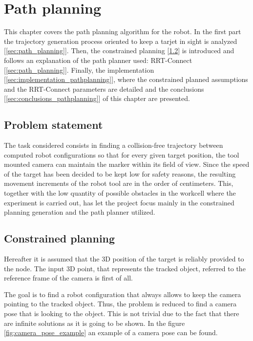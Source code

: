 \chapter{Path planning} %
\label{chap:path_planning}

This chapter covers the path planning algorithm for the robot.
In the first part the trajectory generation process oriented to keep a tarjet in sight is analyzed [\ref{sec:path_planning}]. Then, the constrained planning [\ref{sec:constrained_planning}] is introduced and follows an explanation of the path planner used: RRT-Connect [\ref{sec:path_planning}]. Finally, the implementation [\ref{sec:implementation_pathplanning}], where the constrained planned assumptions and the RRT-Connect parameters are detailed and the conclusions [\ref{sec:conclusions_pathplanning}] of this chapter are presented.
\section{Problem statement} %
\label{sec:path_planning_in_keep_object_in_sight}
The task considered consists in finding a collision-free trajectory between computed robot configurations so that for every given target position, the tool mounted camera can maintain the marker within its field of view. 
Since the speed of the target has been decided to be kept low for safety reasons, the resulting movement increments of the robot tool are in the order of centimeters. 
This, together with the low quantity of possible obstacles in the workcell where the experiment is carried out, has let the project focus mainly in the constrained planning generation and the path planner utilized.

\section{Constrained planning} %
\label{sec:constrained_planning}
Hereafter it is assumed that the 3D position of the target is reliably provided to the node.
The input 3D point, that represents the tracked object, referred to the reference frame of the camera is first of all.

The goal is to find a robot configuration that always allows to keep the camera pointing to the tracked object.
Thus, the problem is reduced to find a camera pose that is looking to the object.
This is not trivial due to the fact that there are infinite solutions as it is going to be shown. In the figure \ref{fig:camera_pose_example} an example of a camera pose can be found.\\

